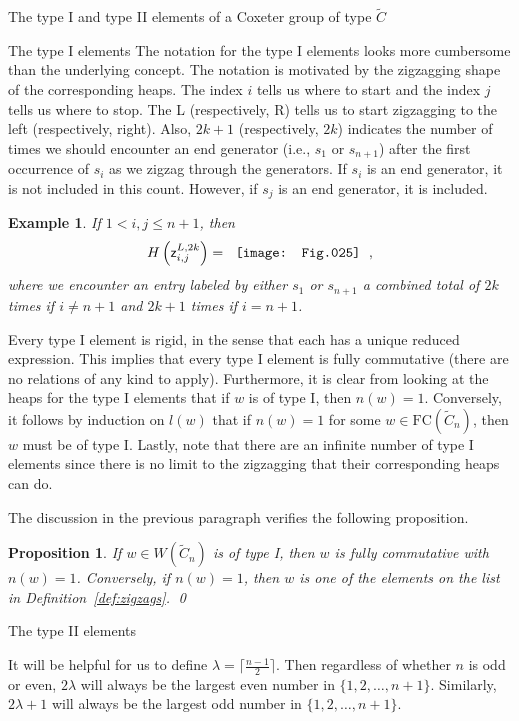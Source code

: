 \documentclass[12pt]{amsart}
\newtheorem{prop}[thm]{Proposition}
\newtheorem{ex}[thm]{Example}
\newcommand{\C}{\widetilde{C}}
\newcommand{\z}{\mathsf{z}}
\renewcommand{\(}{\left(}
\renewcommand{\)}{\right)}
\newcommand{\FC}{\mathrm{FC}}
\begin{document}
\begin{section}{The type {I} and type II elements of a Coxeter group of type $\C$}
\begin{subsection}{The type I elements}
The notation for the type I elements looks more cumbersome than the underlying concept.  The notation is motivated by the zigzagging shape of the corresponding heaps.  The index $i$ tells us where to start and the index $j$ tells us where to stop.  The L (respectively, R) tells us to start zigzagging to the left (respectively, right).  Also, $2k+1$ (respectively, $2k$) indicates the number of times we should encounter an end generator (i.e., $s_{1}$ or $s_{n+1}$) after the first occurrence of $s_{i}$ as we zigzag through the generators.  If $s_{i}$ is an end generator, it is not included in this count.  However, if $s_{j}$ is an end generator, it is included.  

\begin{ex}
If $1<i,j\leq n+1$, then
\[
H\(\z^{L,2k}_{i,j}\)=\begin{tabular}[c]{c}\texttt{[image: Fig.025]}\end{tabular},
\]
where we encounter an entry labeled by either $s_{1}$ or $s_{n+1}$ a combined total of $2k$ times if $i\neq n+1$ and $2k+1$ times if $i=n+1$.  
\end{ex}

Every type I element is rigid, in the sense that each has a unique reduced expression.  This implies that every type I element is fully commutative (there are no relations of any kind to apply).  Furthermore, it is clear from looking at the heaps for the type I elements that if $w$ is of type I, then $n(w)=1$.  Conversely, it follows by induction on $l(w)$ that if $n(w)=1$ for some $w \in \FC(\C_{n})$, then $w$ must be of type I.  Lastly, note that there are an infinite number of type I elements since there is no limit to the zigzagging that their corresponding heaps can do.

The discussion in the previous paragraph verifies the following proposition.

\begin{prop}\label{prop:zigzags}
If $w \in W(\C_{n})$ is of type I, then $w$ is fully commutative with $n(w)=1$.  Conversely, if $n(w)=1$, then $w$ is one of the elements on the list in Definition~\ref{def:zigzags}.   \qed
\end{prop}

\end{subsection}


\begin{subsection}{The type II elements}

It will be helpful for us to define $\lambda=\lceil \frac{n-1}{2}\rceil$.  Then regardless of whether $n$ is odd or even, $2\lambda$ will always be the largest even number in $\{1,2,\dots,n+1\}$.  Similarly, $2\lambda+1$ will always be the largest odd number in $\{1,2,\dots, n+1\}$.


\end{subsection}
\end{section}
\end{document}
